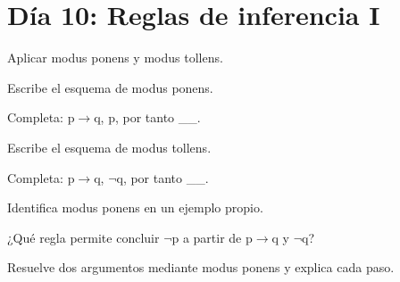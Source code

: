 \section{Día 10: Reglas de inferencia I}

\begin{lesson}[id=dia-10-lectura,weight=0]

Aplicar modus ponens y modus tollens.

\end{lesson}

\begin{activity}[id=dia-10-corta-01,type=short,weight=1]

Escribe el esquema de modus ponens.

\end{activity}

\begin{activity}[id=dia-10-corta-02,type=short,weight=1]

Completa: p\(\to\)q, p, por tanto __.

\end{activity}

\begin{activity}[id=dia-10-corta-03,type=short,weight=1]

Escribe el esquema de modus tollens.

\end{activity}

\begin{activity}[id=dia-10-corta-04,type=short,weight=1]

Completa: p\(\to\)q, \(\neg\)q, por tanto __.

\end{activity}

\begin{activity}[id=dia-10-corta-05,type=short,weight=1]

Identifica modus ponens en un ejemplo propio.

\end{activity}

\begin{activity}[id=dia-10-corta-06,type=short,weight=1]

¿Qué regla permite concluir \(\neg\)p a partir de p\(\to\)q y \(\neg\)q?

\end{activity}

\begin{activity}[id=dia-10-desarrollo-01,type=long,weight=2]

Resuelve dos argumentos mediante modus ponens y explica cada paso.

\end{activity}

